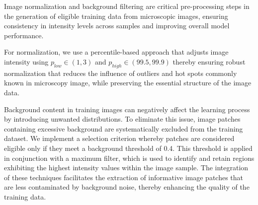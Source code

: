 \documentclass[11pt,
  paper=a4, 
  bibliography=totocnumbered,
	captions=tableheading,
	BCOR=10mm
]{scrreprt}
\theoremstyle{definition}
\begin{document}
Image normalization and background filtering are critical pre-processing steps in the generation of eligible training data from microscopic images, 
ensuring consistency in intensity levels across samples and improving overall model performance. 

\vspace{1cm}
\noindent
For normalization, we use a percentile-based approach that adjusts image intensity using $p_{low} \in (1,3)$ and $p_{high} \in (99.5,99.9)$ thereby ensuring 
robust normalization that reduces the influence of outliers and hot spots commonly  known in microscopy image,  while preserving the essential structure of the image data.


\vspace{1cm}
\noindent
Background content in training images can negatively affect the learning process by introducing unwanted distributions. 
To eliminate this issue, image patches containing excessive background are systematically excluded from the training dataset. We implement 
a selection criterion whereby patches are considered eligible only if they meet a background threshold of 0.4. This threshold is applied in conjunction
with a maximum filter, which is used to identify and retain regions exhibiting the highest intensity values within the image sample. The integration of these
techniques facilitates the extraction of informative image patches that are less contaminated by background noise, thereby enhancing the quality of the training data.








\vspace{1cm}
\end{document}
